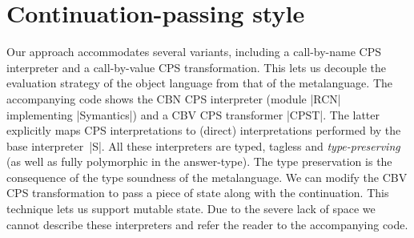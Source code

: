 \ifshort\else
\section{Continuation\hyp passing style}\label{variations}
\label{state}
\label{S:CPS}

Our approach accommodates
several variants, including
a call-by-name CPS interpreter and a call-by-value CPS
transformation.
This lets us decouple the evaluation strategy of the object language
from that of the metalanguage. The accompanying code shows the CBN CPS
interpreter (module |RCN| implementing |Symantics|) and a CBV CPS
transformer |CPST|. The latter explicitly maps CPS interpretations to
(direct) interpretations performed by the base interpreter~|S|. All
these interpreters are typed, tagless and \emph{type-preserving} (as
well as fully polymorphic in the answer-type). The type preservation
is the consequence of the type soundness of the metalanguage.  We can
modify the CBV CPS transformation to pass a piece of state along with
the continuation. This technique lets us support mutable state.  Due
to the severe lack of space we cannot describe these interpreters and
refer the reader to the accompanying code.
\fi

